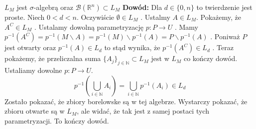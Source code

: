 \begin{tw}
    $L_M$ jest $\sigma$-algebrą oraz $\mathcal{B}(\mathbb{R}^n) \subset L_M$ 
    \newline
    \textbf{Dowód:}\newline
    Dla $d \in \{0, n\}$ to twierdzenie jest proste. Niech $0 < d < n$. Oczywiście $\emptyset \in L_M$ . Ustalmy $A \in L_M$. 
    Pokażemy, że $A^C \in L_M$ . Ustalamy dowolną parametryzację $p: P \rightarrow U$ . Mamy $p^{-1}(A^C) = p^{-1}(M \backslash A) = p^{-1}(M) \backslash p^{-1}(A) = P \backslash p^{-1}(A)$ . Poniważ $P$ jest otwarty oraz $p^{-1}(A) \in L_d$ to stąd wynika, że $p^{-1}(A^C) \in L_d$ .
    Teraz pokażemy, że przeliczalna suma $\{A_j\}_{j \in \mathbb{N}} \subset L_M$ jest w $L_M$ co kończy dowód. Ustaliamy dowolne $p: P \rightarrow U$. $$ 
    p^{-1}(\bigcup_{i \in \mathbb{N}} A_i ) = \bigcup_{i \in \mathbb{N}} p^{-1}(A_i) \in L_d
    $$ Zostało pokazać, że zbiory borelowske są w tej algebrze. Wystarczy pokazać, że zbioru otwarte są w $L_M$, ale widać, że tak jest z samej postaci tych parametryzacji. To kończy dowód.  
\end{tw}